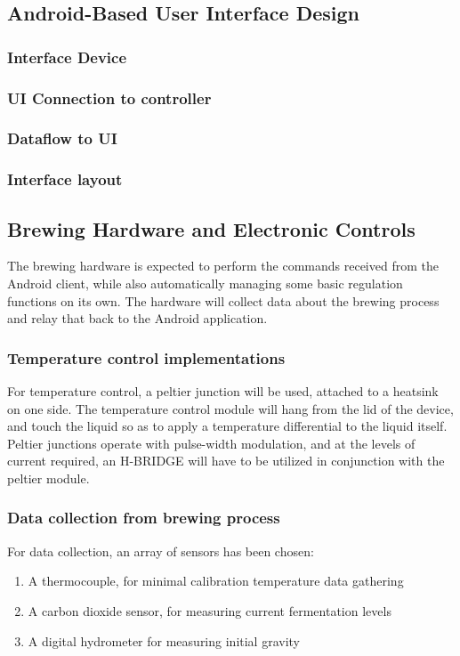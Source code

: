 \documentclass[draftclsnofoot,onecolumn,letterpaper,10pt]{IEEEtran}
\begin{document}
\subsection{Android-Based User Interface Design} %
\subsubsection{Interface Device}

\subsubsection{UI Connection to controller}

\subsubsection{Dataflow to UI}

\subsubsection{Interface layout}


\subsection{Brewing Hardware and Electronic Controls} %
The brewing hardware is expected to perform the commands received from the Android client, while also automatically managing
some basic regulation functions on its own. The hardware will collect data about the brewing process and relay that back to the
Android application.

\subsubsection{Temperature control implementations}
For temperature control, a peltier junction will be used, attached to a heatsink on one side. The temperature control module will
hang from the lid of the device, and touch the liquid so as to apply a temperature differential to the liquid itself. Peltier junctions 
operate with pulse-width modulation, and at the levels of current required, an H-BRIDGE will have to be utilized in conjunction with the 
peltier module.

\subsubsection{Data collection from brewing process}
For data collection, an array of sensors has been chosen:
\begin{enumerate}
	\item A thermocouple, for minimal calibration temperature data gathering
	\item A carbon dioxide sensor, for measuring current fermentation levels
	\item A digital hydrometer for measuring initial gravity
\end{enumerate}
\end{document}
